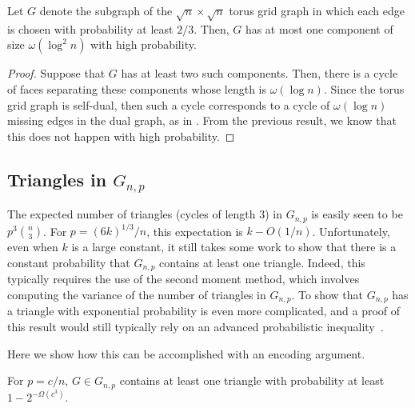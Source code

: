 \documentclass{patmorin}
\begin{document}
\begin{thm}
  Let $G$ denote the subgraph of the $\sqrt{n} \times \sqrt{n}$ torus
  grid graph in which each edge is chosen with probability at least
  $2/3$. Then, $G$ has at most one component of size
  $\omega(\log^2 n)$ with high probability.
\end{thm}
\begin{proof}
  Suppose that $G$ has at least two such components. Then, there is a
  cycle of faces separating these components whose length is
  $\omega(\log n)$. Since the torus grid graph is self-dual, then such
  a cycle corresponds to a cycle of $\omega(\log n)$ missing edges in
  the dual graph, as in . From the previous
  result, we know that this does not happen with high probability.
\end{proof}


\subsection{Triangles in $G_{n,p}$}

The expected number of triangles (cycles of length 3) in $G_{n,p}$ is
easily seen to be $p^3\binom{n}{3}$.  For $p=(6k)^{1/3}/n$, this
expectation is $k-O(1/n)$.  Unfortunately, even when $k$ is a large
constant, it still takes some work to show that there is a constant
probability that $G_{n,p}$ contains at least one triangle. Indeed,
this typically requires the use of the second moment method, which
involves computing the variance of the number of triangles in
$G_{n,p}$. To show that $G_{n, p}$ has a triangle with exponential
probability is even more complicated, and a proof of this result would
still typically rely on an advanced probabilistic
inequality~\cite{alon:probabilistic}.

Here we show how this can be accomplished with an encoding argument.

\begin{thm}
  For $p=c/n$, $G \in G_{n,p}$ contains at least one triangle with
  probability at least $1-2^{-\Omega(c^3)}$.
\end{thm}
\end{document}
